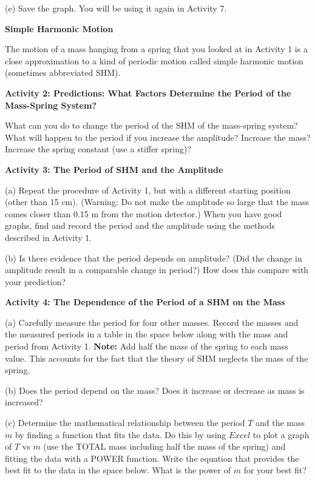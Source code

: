 (e) Save the graph. You will be using it again in Activity 7.

\newpage

\textbf{Simple Harmonic Motion }

The motion of a mass hanging from a spring that you looked at in Activity 1
is a close approximation to a kind of periodic motion called simple harmonic
motion (sometimes abbreviated SHM).

\textbf{Activity 2: Predictions:  What Factors Determine the Period of the Mass-Spring System? }

What can you do to change the period of the SHM of the mass-spring system? What
will happen to the period if you increase the amplitude? Increase the mass?
Increase the spring constant (use a stiffer spring)?
\vspace{30mm}

\textbf{Activity 3: The Period of SHM and the Amplitude} 

(a) Repeat the procedure of Activity 1, but with a different starting position
(other than 15 cm). (Warning: Do not make the amplitude so large that the mass
comes closer than 0.15 m from the motion detector.) When you have good graphs,
find and record the period and the amplitude using the methods described in
Activity 1. 
\vspace{20mm}


(b) Is there evidence that the period depends on amplitude? (Did the change
in amplitude result in a comparable change in period?) How does this
compare with your prediction?
\vspace{30mm}

\textbf{Activity 4: The Dependence of the Period of a SHM on the Mass} 

(a) Carefully measure the period for four other masses. Record the masses and
the measured periods in a table in the space below along with the mass and 
period from Activity 1. \textbf{Note:} Add half the mass of the spring to each
mass value. This accounts for the fact that the theory of SHM neglects the mass 
of the spring.
\vspace{35mm}

(b) Does the period depend on the mass? Does it increase or decrease as mass
is increased?
\vspace{15mm}

(c) Determine the mathematical relationship between the period $T$ and the mass
$m$ by finding a function that fits the data. Do this by using $Excel$ to plot 
a graph of $T$ vs $m$ (use the TOTAL mass including half the mass of the 
spring) and fitting the data with a POWER function. Write the equation that 
provides the best fit to the data in the space below. What is the power of 
$m$ for your best fit?
\vspace{20mm}

